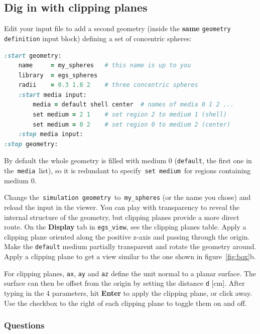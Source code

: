 \documentclass[12pt,twoside]{article}
\begin{document}
\clearpage
\subsection{\label{sec:clip}Dig in with clipping planes}

Edit your input file to add a second geometry (inside the \textbf{same}
\Verb|geometry definition| input block) defining a set of concentric
spheres:
{\small
\begin{lstlisting}[language=ruby,backgroundcolor=\color{white}]
:start geometry:
    name     = my_spheres   # this name is up to you
    library  = egs_spheres
    radii    = 0.3 1.8 2    # three concentric spheres
    :start media input:
        media = default shell center  # names of media 0 1 2 ...
        set medium = 2 1    # set region 2 to medium 1 (shell)
        set medium = 0 2    # set region 0 to medium 2 (center)
    :stop media input:
:stop geometry:
\end{lstlisting}
}

By default the whole geometry is filled with medium 0 (\Verb|default|, the first
one in the \,\Verb|media|\, list), so it is redundant to specify
\,\Verb|set medium|\, for regions containing medium 0.

Change the \,\Verb|simulation geometry|\, to \,\Verb|my_spheres| (or the name
you
chose) and reload the input in the viewer. You can play with transparency to
reveal the internal structure of the geometry, but clipping planes provide a
more direct route. On the \textbf{Display} tab in \Verb|egs_view|, see the
clipping planes table. Apply a clipping plane oriented along the positive z-axis
and passing through the origin. Make the \Verb|default| medium partially
transparent and rotate the geometry around. Apply a clipping plane to get a view
similar to the one shown in figure~\ref{fig:box}b.

For clipping planes, \Verb|ax|, \Verb|ay| and \Verb|az| define the unit normal
to a planar surface. The surface can then be offset from the origin by setting
the distance \Verb|d| [cm]. After typing in the 4 parameters, hit \textbf{Enter}
to apply the clipping plane, or click away. Use the checkbox to the right of each clipping
plane to toggle them on and off.

\subsubsection{Questions}
\end{document}
